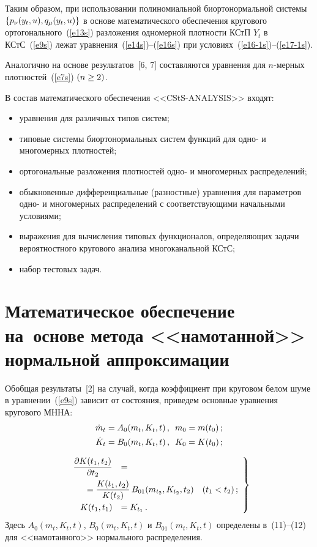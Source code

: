 \begin{multicols}{2}
\smallskip

Таким образом, при использовании полиномиальной биортонормальной сис\-те\-мы  
$\left\{ p_\nu (y_t,u), q_\mu (y_t,u)\right\}$ в основе математического обеспечения 
кругового ортогонального~(\ref{e13s}) разложения одномерной плотности КСтП  
$Y_t$ в КСтС~(\ref{e9s}) лежат уравнения~(\ref{e14s})--(\ref{e16s}) при условиях~(\ref{e16-1s})--(\ref{e17-1s}).

Аналогично на основе результатов~[6, 7] составляются уравнения для $n$-мер\-ных 
плот\-но\-стей~(\ref{e7s}) $(n\hm\ge 2)$.

В состав математического обеспечения  <<CStS-ANALYSIS>> входят:
\begin{itemize}
\item
уравнения для различных типов систем;
\item
типовые системы биортонормальных сис\-тем функций для одно- и многомерных плотностей;
\item
ортогональные разложения плотностей одно- и многомерных распределений;
\item
обыкновенные дифференциальные (разностные) уравнения для параметров одно- и 
многомерных распределений с соответствующими начальными условиями;
\item
выражения для вычисления типовых функционалов, определяющих задачи вероятностного 
кругового анализа многоканальной КСтС;
\item
набор тестовых задач.
\end{itemize}

\section{Математическое обеспечение на~основе метода <<намотанной>> нормальной аппроксимации}

Обобщая результаты~[2] на случай, когда коэффициент при круговом белом шуме в 
уравнении~(\ref{e9s}) 
зависит от состояния, приведем основные уравнения кругового МННА:
\begin{align}
\dot m_t &=A_0 (m_t, K_t, t)\,,\enskip m_0 = m(t_0)\,;\label{e18s}\\
\dot K_t &=B_0 (m_t, K_t, t)\,,\enskip K_0 = K(t_0)\,;\label{e19s}
\end{align}

\noindent
\begin{equation}
\left.
\begin{array}{rl}
\fr{\prt K(t_1, t_2)}{\prt t_2} &=\\[9pt] 
&\hspace*{-15mm}{}=\fr{K(t_1, t_2)}{K(t_2)}\, B_{01}(m_{t_2}, K_{t_2}, t_2)\quad 
(t_1< t_2)\,;\\[9pt]
 K(t_1, t_1) &= K_{t_1}\,.
 \end{array}
 \right\}
 \label{e20s}
\end{equation}
Здесь  $A_0(m_t, K_t, t)$, $B_0(m_t, K_t, t)$ и $B_{01}(m_t, K_t, t)$  
определены в~(11)--(12) для 
<<намотанного>> нормального распределения.


\end{multicols}
